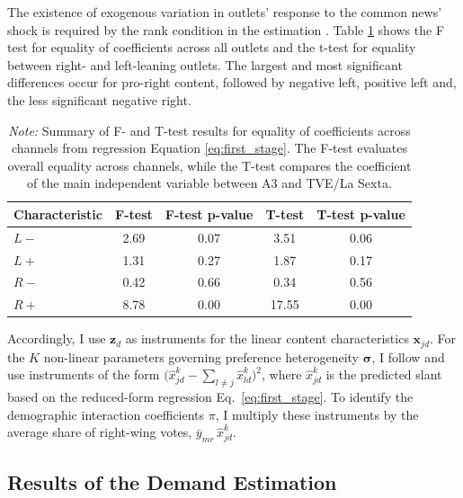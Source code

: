 \documentclass[12pt]{article}
\begin{document}
		The existence of exogenous variation in outlets' response to the common news' shock is required by the rank condition in the estimation \citep{berry_haile_econometrica}.  Table \ref{tab:tests}   shows the F test for equality of coefficients across all outlets and the t-test for equality between right- and left-leaning outlets. The largest and most significant differences occur for pro-right content, followed by negative left, positive left and, the less significant negative right. 
	
	
	
	\begin{table}[!htbp]
		\centering
	

		\caption{Tests for Differences in Coefficients}
		\begin{tabular}{lcccc}
			\hline
			Characteristic & F-test  & F-test p-value & T-test  & T-test p-value \\
			\hline
			$ {L-}$& 2.69 & 0.07 & 3.51  & 0.06 \\
			$ {L+}$ & 1.31 & 0.27 & 1.87  & 0.17 \\
			$ {R-}$ & 0.42 & 0.66 & 0.34 & 0.56 \\
$ {R+}$ & 8.78 & 0.00 & 17.55  & 0.00 \\
			\hline
		\end{tabular}
			\caption*{\small \textit{Note:} Summary of F- and T-test results for equality of coefficients across channels from regression Equation \eqref{eq:first_stage}. The F-test evaluates overall equality across channels, while the T-test compares the coefficient of the main independent variable between A3 and TVE/La Sexta.}
					\label{tab:tests}
	\end{table}
	

	
		
	
	Accordingly, I use
	$\bm{z}_{d}$
	as instruments for the linear content characteristics $ \bm{x}_{jd}$.  For the $K$ non-linear parameters governing preference heterogeneity $ \bm{\sigma}$, I follow \citet{gandhi2019measuring} and use instruments of the form 
	$\bigl(\hat{x}_{jd}^k-\sum_{l\neq j}\hat{x}_{ld}^k\bigr)^2$,
	where $\hat{x}_{jd}^k$ is the predicted slant based on the reduced-form regression Eq.~\eqref{eq:first_stage}. 	To identify the demographic interaction coefficients $\pi$, I multiply these instruments by the average share of right-wing votes, $\bar y_{mr}\,\hat{x}_{jd}^k$.



	\subsection{Results of the Demand Estimation}
	
\end{document}
